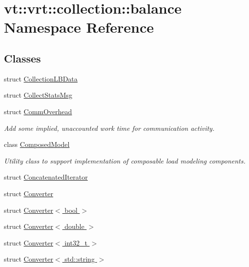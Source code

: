 \hypertarget{namespacevt_1_1vrt_1_1collection_1_1balance}{}\section{vt\+:\+:vrt\+:\+:collection\+:\+:balance Namespace Reference}
\label{namespacevt_1_1vrt_1_1collection_1_1balance}
\subsection*{Classes}
\begin{DoxyCompactItemize}
\item 
struct \hyperlink{structvt_1_1vrt_1_1collection_1_1balance_1_1_collection_l_b_data}{Collection\+L\+B\+Data}
\item 
struct \hyperlink{structvt_1_1vrt_1_1collection_1_1balance_1_1_collect_stats_msg}{Collect\+Stats\+Msg}
\item 
struct \hyperlink{structvt_1_1vrt_1_1collection_1_1balance_1_1_comm_overhead}{Comm\+Overhead}
\begin{DoxyCompactList}\small\item\em Add some implied, unaccounted work time for communication activity. \end{DoxyCompactList}\item 
class \hyperlink{classvt_1_1vrt_1_1collection_1_1balance_1_1_composed_model}{Composed\+Model}
\begin{DoxyCompactList}\small\item\em Utility class to support implementation of composable load modeling components. \end{DoxyCompactList}\item 
struct \hyperlink{structvt_1_1vrt_1_1collection_1_1balance_1_1_concatenated_iterator}{Concatenated\+Iterator}
\item 
struct \hyperlink{structvt_1_1vrt_1_1collection_1_1balance_1_1_converter}{Converter}
\item 
struct \hyperlink{structvt_1_1vrt_1_1collection_1_1balance_1_1_converter_3_01bool_01_4}{Converter$<$ bool $>$}
\item 
struct \hyperlink{structvt_1_1vrt_1_1collection_1_1balance_1_1_converter_3_01double_01_4}{Converter$<$ double $>$}
\item 
struct \hyperlink{structvt_1_1vrt_1_1collection_1_1balance_1_1_converter_3_01int32__t_01_4}{Converter$<$ int32\+\_\+t $>$}
\item 
struct \hyperlink{structvt_1_1vrt_1_1collection_1_1balance_1_1_converter_3_01std_1_1string_01_4}{Converter$<$ std\+::string $>$}

\end{DoxyCompactItemize}
